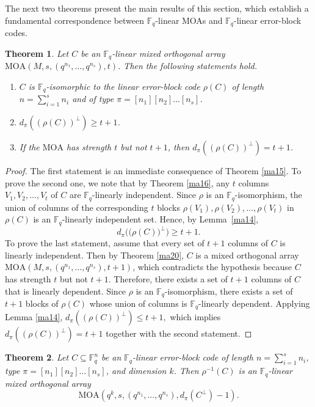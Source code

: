 \documentclass[11pt]{article}
\newtheorem{Theorem}{Theorem}[section]
\newtheorem{Definition and Notation}[Theorem]{Definition and Notation}
\begin{document}
The next two theorems present the main results of this section, which establish a fundamental correspondence between $\mathbb{F}_q$-linear MOAs and $\mathbb{F}_q$-linear error-block codes.

\begin{Theorem}\label{necessary-condition}
 Let $C$ be an $\mathbb F_q$-linear mixed orthogonal array $\mathrm{MOA}\left(M, s, (q^{n_1}, \dots, q^{n_s}), t\right)$. Then the following statements hold.
  \begin{enumerate}
     \item $C$ is $\mathbb F_q$-isomorphic to the linear error-block code $\rho(C)$ of length $n=
     \sum_{i=1}^s n_i$ and of type $\pi=[n_1][n_2]\ldots[n_s]$.
     \item $d_\pi((\rho(C))^\perp)\geq t+1$.
     \item If the $\mathrm{MOA}$ has strength $t$ but not $t+1$, then $d_\pi((\rho(C))^\perp)= t+1$.
 \end{enumerate}
\end{Theorem}

\begin{proof}
The first statement is an immediate consequence of Theorem \ref{ma15}. To prove the second one, we note that by Theorem \ref{ma16}, any $t$ columns $V_1, V_2, \ldots, V_t$ of $C$ are $\mathbb F_q$-linearly independent. 
Since $\rho$ is an $\mathbb F_q$-isomorphism, the union of columns of the corresponding $t$ blocks $\rho(V_1), \rho(V_2), \ldots, \rho(V_t)$ in $\rho(C)$ is an $\mathbb F_q$-linearly independent set. Hence, by Lemma~\ref{ma14},
$$d_{\pi}\Big(\big(\rho(C)\big)^{\perp}\Big)\ge t+1.$$
To prove the last statement,  assume that every set of $t+1$ columns of $C$ is linearly independent. Then by Theorem \ref{ma20}, $C$ is a mixed orthogonal array $\mathrm{MOA}(M, s, (q^{n_1}, \dots, q^{n_s}), t+1)$, which contradicts the hypothesis because $C$ has strength $t$ but not $t+1$. Therefore, there exists a set of $t+1$ columns of $C$ that is linearly dependent. Since $\rho$ is an $\mathbb F_q$-isomorphism, there exists a set of $t+1$ blocks of $\rho(C)$ whose union of columns is $\mathbb F_q$-linearly dependent.  Applying Lemma \ref{ma14},  $d_\pi((\rho(C))^\perp)\leq t+1,$ which implies $d_\pi((\rho(C))^\perp)= t+1$ together with the second statement.
\end{proof}

\begin{Theorem}\label{th:so}
Let $C \subseteq\mathbb F_q^n$ be an $\mathbb{F}_q$-linear error-block code of length $n=\sum_{i=1}^s n_i$, type $\pi=[n_1][n_2]\ldots[n_s]$, and dimension $k$. Then  $\rho^{-1}(C)$ is an $\mathbb F_q$-linear mixed orthogonal array 
     $$\mathrm{MOA}\left(q^k, s, (q^{n_1}, \dots, q^{n_s}), d_\pi(C^{\perp})-1\right).$$
\end{Theorem}
\end{document}
